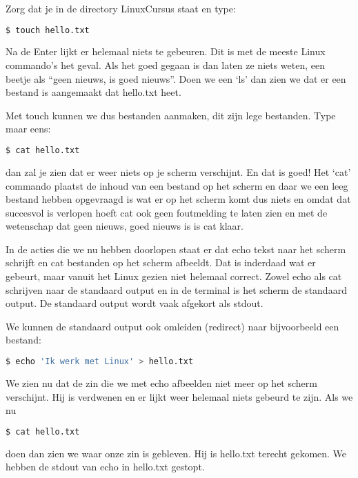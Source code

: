 Zorg dat je in de directory LinuxCursus staat en type:

\begin{lstlisting}[language=bash]
$ touch hello.txt
\end{lstlisting}

Na de Enter lijkt er helemaal niets te gebeuren. Dit is met de meeste Linux commando's het geval. Als het goed gegaan is
dan laten ze niets weten, een beetje als ``geen nieuws, is goed nieuws''. Doen we een `ls' dan zien we dat er een
bestand is aangemaakt dat hello.txt heet.

Met touch kunnen we dus bestanden aanmaken, dit zijn lege bestanden. Type maar eens:

\begin{lstlisting}[language=bash]
$ cat hello.txt
\end{lstlisting}

dan zal je zien dat er weer niets op je scherm verschijnt. En dat is goed! Het `cat' commando plaatst de inhoud van een
bestand op het scherm en daar we een leeg bestand hebben opgevraagd is wat er op het scherm komt dus niets en omdat dat
succesvol is verlopen hoeft cat ook geen foutmelding te laten zien en met de wetenschap dat geen nieuws, goed nieuws is
is cat klaar.

In de acties die we nu hebben doorlopen staat er dat echo tekst naar het scherm schrijft en cat
bestanden op het scherm afbeeldt. Dat is inderdaad wat er gebeurt, maar vanuit het Linux gezien niet helemaal correct.
Zowel echo als cat schrijven naar de standaard output en in de terminal is het scherm de standaard output. De standaard
output wordt vaak afgekort als stdout.

We kunnen de standaard output ook omleiden (redirect) naar bijvoorbeeld een bestand:

\begin{lstlisting}[language=bash]
$ echo 'Ik werk met Linux' > hello.txt
\end{lstlisting}

We zien nu dat de zin die we met echo afbeelden niet meer op het scherm verschijnt. Hij is verdwenen en er lijkt weer
helemaal niets gebeurd te zijn. Als we nu

\begin{lstlisting}[language=bash]
$ cat hello.txt
\end{lstlisting}

doen dan zien we waar onze zin is gebleven. Hij is hello.txt terecht gekomen. We hebben de stdout van echo in hello.txt
gestopt.

